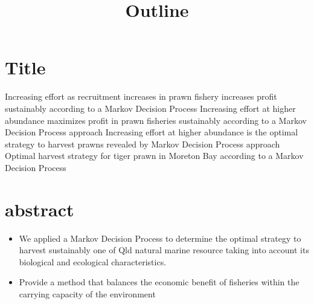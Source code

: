 \documentclass[11pt]{article}
\begin{document}
\title{Outline}
\maketitle


\section{Title}


Increasing effort as recruitment increases in prawn fishery increases profit sustainably according to a Markov Decision Process
Increasing effort at higher abundance maximizes profit in prawn fisheries sustainably according to a Markov Decision Process approach
Increasing effort at higher abundance is the optimal strategy to harvest prawns revealed by Markov Decision Process approach
Optimal harvest strategy for tiger prawn in Moreton Bay according to a Markov Decision Process

\section{abstract}

\begin{itemize}
\item We applied a Markov Decision Process to determine the optimal strategy to harvest sustainably one of Qld natural marine resource taking into account its biological and ecological characteristics.
\item Provide a method that balances the economic benefit of fisheries within the carrying capacity of the environment
\end{itemize}
\end{document}
